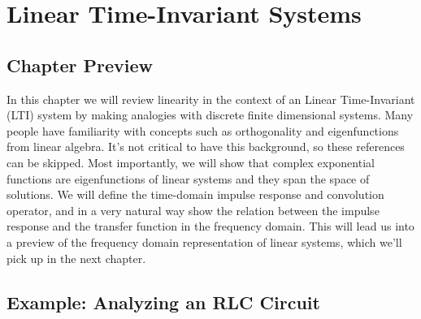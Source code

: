 \chapter{Linear Time-Invariant Systems}
\graphicspath{{./figs_LTI/}}
\section{Chapter Preview}
In this chapter we will review linearity in the context of an Linear Time-Invariant (LTI) system by making analogies with discrete finite dimensional systems.  Many people have familiarity with concepts such as orthogonality and eigenfunctions from linear algebra.  It's not critical to have this background, so these references can be skipped.  Most importantly, we will show that complex exponential functions are eigenfunctions of linear systems and they span the space of solutions.  We will define the time-domain impulse response and convolution operator, and in a very natural way show the relation between the impulse response and the transfer function in the frequency domain.  This will lead us into a preview of the frequency domain representation of linear systems, which we'll pick up in the next chapter.
\section{Example:  Analyzing an RLC Circuit}
